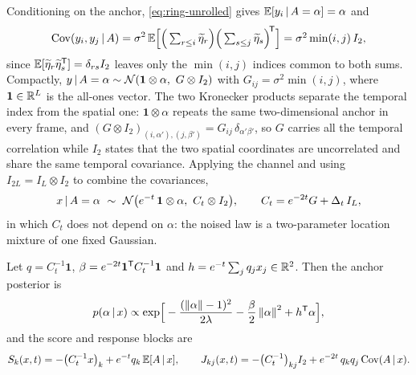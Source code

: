 Conditioning on the anchor, \eqref{eq:ring-unrolled} gives
$\mathbb{E}[y_i \,|\, A = \alpha] = \alpha$ and
\begin{equation}
  \mathrm{Cov}(y_i, y_j \,|\, A)
  = \sigma^2\, \mathbb{E}\Big[\Big(\textstyle\sum_{r \le i}\widetilde\eta_r\Big)
      \Big(\textstyle\sum_{s \le j}\widetilde\eta_s\Big)^{\!\mathsf{T}}\Big]
  = \sigma^2 \min(i,j)\, I_2 ,
  \label{eq:ring-K}
\end{equation}
since $\mathbb{E}[\widetilde\eta_r \widetilde\eta_s^{\mathsf{T}}] = \delta_{rs} I_2$ leaves only
the $\min(i,j)$ indices common to both sums. Compactly,
$y \,|\, A = \alpha \sim \mathcal{N}(\mathbf{1} \otimes \alpha,\ G \otimes I_2)$
with $G_{ij} = \sigma^2\min(i,j)$, where $\mathbf 1 \in \mathbb{R}^L$ is the
all-ones vector. The two Kronecker products separate the temporal index from
the spatial one: $\mathbf 1 \otimes \alpha$ repeats the same two-dimensional
anchor in every frame, and
$(G \otimes I_2)_{(i,\alpha'),(j,\beta')}
= G_{ij}\,\delta_{\alpha'\beta'}$, so $G$ carries all the temporal
correlation while $I_2$ states that the two spatial coordinates are
uncorrelated and share the same temporal covariance. Applying the channel and
using $I_{2L} = I_L \otimes I_2$ to combine the covariances,
\begin{equation}
  x \,|\, A = \alpha
  \ \sim\ \mathcal{N}\big(e^{-t}\,\mathbf 1 \otimes \alpha,\ C_t \otimes I_2\big),
  \qquad
  C_t = e^{-2t}G + \Delta_t\, I_L ,
  \label{eq:ring-Ct}
\end{equation}
in which $C_t$ does not depend on $\alpha$: the noised law is a two-parameter
location mixture of one fixed Gaussian.

\begin{proposition}\label{prop:ring-exact}
Let $q = C_t^{-1}\mathbf 1$, $\beta = e^{-2t}\mathbf 1^{\mathsf{T}} C_t^{-1}\mathbf 1$
and $h = e^{-t}\sum_j q_j x_j \in \mathbb{R}^2$. Then the anchor posterior is
\begin{equation}
  p(\alpha \,|\, x) \propto
  \exp\!\Big[ -\frac{(\left\lVert \alpha \right\rVert-1)^2}{2\lambda}
              - \frac{\beta}{2}\left\lVert \alpha \right\rVert^2 + h^{\mathsf{T}}\alpha \Big] ,
  \label{eq:ring-anchor-posterior}
\end{equation}
and the score and response blocks are
\begin{equation}
  S_k(x,t) = -\big(C_t^{-1}x\big)_k + e^{-t} q_k\, \mathbb{E}[A \,|\, x] ,
  \qquad
  J_{kj}(x,t) = -\big(C_t^{-1}\big)_{kj} I_2
                + e^{-2t}\, q_k q_j\, \mathrm{Cov}(A \,|\, x) .
  \label{eq:ring-surrogate-score}
\end{equation}
\end{proposition}

